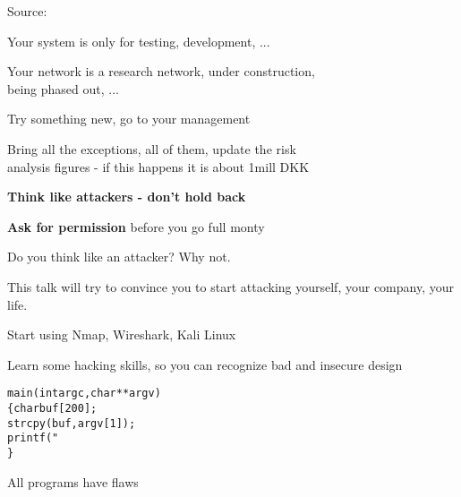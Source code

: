 \documentclass[Screen16to9,17pt,footrule]{foils}
\begin{document}
Source: 




Your system is only for testing, development, ...

Your network is a research network, under construction, \\
being phased out, ...

Try something new, go to your management

Bring all the exceptions, all of them, update the risk \\
analysis figures - if this happens it is about 1mill DKK



{\bf Think like attackers - don't hold back}

\vskip 5mm
{\bf Ask for permission} before you go full monty



\vskip 2cm

\begin{center}

\bf\Large

Do you think like an attacker?
\vskip 5mm
Why not.
\end{center}

\begin{list2}
\item This talk will try to convince you to start attacking yourself, your company, your life.
\item Start using Nmap, Wireshark, Kali Linux
\item Learn some hacking skills, so you can recognize bad and insecure design
\end{list2}




\begin{alltt}
main(int argc, char **argv)
\{      char buf[200];
        strcpy(buf, argv[1]);
        printf("%s\textbackslash{}n",buf);
\}
\end{alltt}

\centerline{All programs have flaws}


\end{document}
